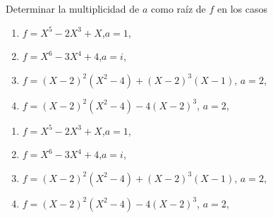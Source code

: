 \ejercicio
Determinar la multiplicidad de $a$ como raíz de $f$  en los casos
\begin{enumerate}[label=\roman*)] 
 \item $f = X^5 - 2X^3 + X$,\quad $a=1$,\\ 
 \item $f = X^6 - 3X^4 + 4$,\quad $a=i$,\\ 
 \item $f = (X-2)^2(X^2-4) + (X-2)^3(X-1)$, \quad $a=2$,\\ 
 \item $f = (X-2)^2(X^2-4) - 4(X-2)^3$, \quad $a=2$,\\ 
 \end{enumerate}

 \separadorCorto

\begin{enumerate}[label=\roman*)] 
 \item $f = X^5 - 2X^3 + X$,\quad $a=1$,\\ 
   \hacer

 \item $f = X^6 - 3X^4 + 4$,\quad $a=i$,\\ 
   \hacer

 \item $f = (X-2)^2(X^2-4) + (X-2)^3(X-1)$, \quad $a=2$,\\ 
   \hacer

 \item $f = (X-2)^2(X^2-4) - 4(X-2)^3$, \quad $a=2$,\\ 
   \hacer
 \end{enumerate}

